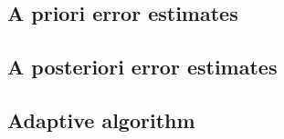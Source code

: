 
\subsection{A priori error estimates}
\subsection{A posteriori error estimates}
\subsection{Adaptive algorithm}

